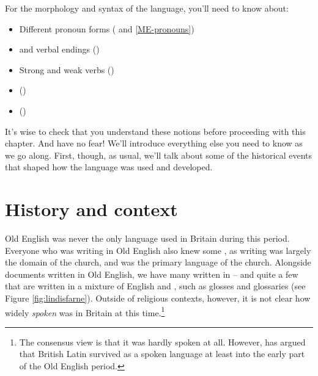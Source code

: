 \noindent For the morphology and syntax of the language, you'll need to know about:

\begin{itemize}
    \item Different pronoun forms ( and \ref{ME-pronouns})
    \item {} 
    and verbal endings ()
    \item Strong and weak verbs ()
    \item {} ()
    \item {} ()
\end{itemize}

\noindent It's wise to check that you understand these notions before proceeding with this chapter. And have no fear! We'll introduce everything else you need to know as we go along. First, though, as usual, we'll talk about some of the historical events that shaped how the language was used and developed.

\section{History and context}

Old English was never the only language used in Britain during this period. Everyone who was writing in Old English also knew some , as writing was largely the domain of the church, and  was the primary language of the church. Alongside documents written in Old English, we have many written in  -- and quite a few that are written in a mixture of English and , such as glosses and glossaries (see Figure \ref{fig:lindisfarne}). Outside of religious contexts, however, it is not clear how widely \emph{spoken}  was in Britain at this time.\footnote{The consensus view is that it was hardly spoken at all. However, \citet{Schrijver2013} has argued that British Latin survived as a spoken language at least into the early part of the Old English period.}

